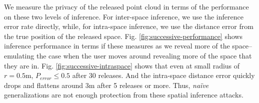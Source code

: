 We measure the privacy of the released point cloud in terms of the performance on these two levels of inference. For inter-space inference, we use the inference error rate directly, while, for intra-space inference, we use the distance error from the true position of the released space. Fig. \ref{fig:successive-performance} shows inference performance in terms if these measures as we reveal more of the space--emulating the case when the user moves around revealing more of the space that they are in. Fig. \ref{fig:successive-intraspace} shows that even at small radius of $r = 0.5$m, $P_{error}\leq0.5$ after 30 releases. And the intra-space distance error quickly drops and flattens around $3$m after 5 releases or more. Thus, \textit{na\"ive} generalizations are not enough protection from these spatial inference attacks.

